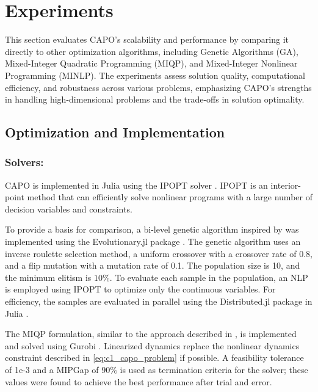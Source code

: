 \documentclass[runningheads]{llncs}
\begin{document}
\section{Experiments}\label{sec:Experiment}
\vspace{-10pt}
This section evaluates CAPO's scalability and performance by comparing it directly to other optimization algorithms, including Genetic Algorithms (GA), Mixed-Integer Quadratic Programming (MIQP), and Mixed-Integer Nonlinear Programming (MINLP). The experiments assess solution quality, computational efficiency, and robustness across various problems, emphasizing CAPO's strengths in handling high-dimensional problems and the trade-offs in solution optimality.

\subsection{Optimization and Implementation}
\subsubsection{Solvers:} CAPO is implemented in Julia using the IPOPT solver \cite{Wachter2006}. IPOPT is an interior-point method that can efficiently solve nonlinear programs with a large number of decision variables and constraints.

To provide a basis for comparison, a bi-level genetic algorithm inspired by \cite{bruant2010optimal} was implemented using the Evolutionary.jl package \cite{wildart2022}. The genetic algorithm uses an inverse roulette selection method, a uniform crossover with a crossover rate of 0.8, and a flip mutation with a mutation rate of 0.1. The population size is 10, and the minimum elitism is $10\%$. To evaluate each sample in the population, an NLP is employed using IPOPT to optimize only the continuous variables. For efficiency, the samples are evaluated in parallel using the Distributed.jl package in Julia \cite{bezanson2017julia}.

The MIQP formulation, similar to the approach described in \cite{Chanekar2017}, is implemented and solved using Gurobi \cite{gurobi}. Linearized dynamics replace the nonlinear dynamics constraint described in \eqref{eq:c1_capo_problem} if possible. A feasibility tolerance of 1e-3 and a MIPGap of $90\%$ is used as termination criteria for the solver; these values were found to achieve the best performance after trial and error. 
\end{document}
